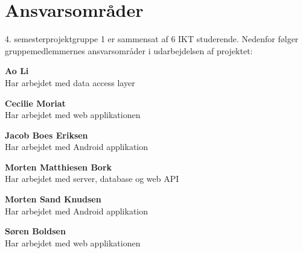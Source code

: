 \section{Ansvarsområder}
4. semesterprojektgruppe 1 er sammensat af 6 IKT studerende. Nedenfor følger gruppemedlemmernes ansvarsområder i udarbejdelsen af projektet:

\textbf{Ao Li} \\
Har arbejdet med data access layer

\textbf{Cecilie Moriat}\\
Har arbejdet med web applikationen

\textbf{Jacob Boes Eriksen} \\
Har arbejdet med Android applikation

\textbf{Morten Matthiesen Bork} \\
Har arbejdet med server, database og web API

\textbf{Morten Sand Knudsen} \\
Har arbejdet med Android applikation

\textbf{Søren Boldsen} \\
Har arbejdet med web applikationen

